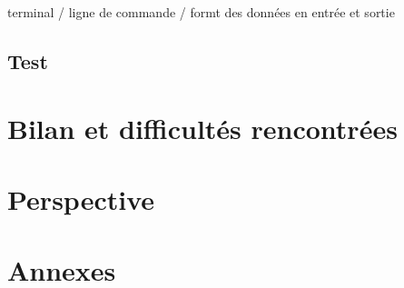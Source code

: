 \documentclass[oneside,13pt,a4paper]{report}
\begin{document}
            terminal / ligne de commande / formt des données en entrée et sortie

        \section{Test}



    \chapter{Bilan et difficultés rencontrées}


    \chapter{Perspective}


    \chapter{Annexes}

    
\end{document}

